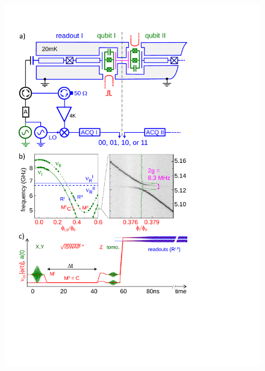 \begin{figure}
	\centering
		\includegraphics[width=1.\textwidth]{./material/papers/iswap/submission1/Dewes_Figure1}
	\label{fig:iSwap1}
	\caption{}
\end{figure}

